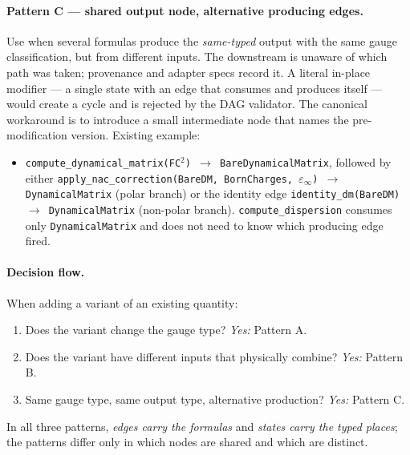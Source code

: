 \documentclass[11pt,a4paper]{article}
\begin{document}
\paragraph{Pattern C --- shared output node, alternative producing edges.}
Use when several formulas produce the \emph{same-typed} output with the same
gauge classification, but from different inputs. The downstream is unaware of
which path was taken; provenance and adapter specs record it. A literal
in-place modifier --- a single state with an edge that consumes and produces
itself --- would create a cycle and is rejected by the DAG validator. The
canonical workaround is to introduce a small intermediate node that names
the pre-modification version. Existing example:
\begin{itemize}[leftmargin=2em]
  \item \texttt{compute\_dynamical\_matrix(FC$^2$) $\to$ BareDynamicalMatrix},
        followed by either
        \texttt{apply\_nac\_correction(BareDM, BornCharges, $\varepsilon_\infty$)
        $\to$ DynamicalMatrix} (polar branch) or the identity edge
        \texttt{identity\_dm(BareDM) $\to$ DynamicalMatrix} (non-polar
        branch). \texttt{compute\_dispersion} consumes only
        \texttt{DynamicalMatrix} and does not need to know which producing
        edge fired.
\end{itemize}

\paragraph{Decision flow.} When adding a variant of an existing quantity:
\begin{enumerate}[leftmargin=2em]
  \item Does the variant change the gauge type? \emph{Yes:} Pattern A.
  \item Does the variant have different inputs that physically combine?
        \emph{Yes:} Pattern B.
  \item Same gauge type, same output type, alternative production?
        \emph{Yes:} Pattern C.
\end{enumerate}
In all three patterns, \emph{edges carry the formulas} and \emph{states carry
the typed places}; the patterns differ only in which nodes are shared and
which are distinct.
\end{document}
